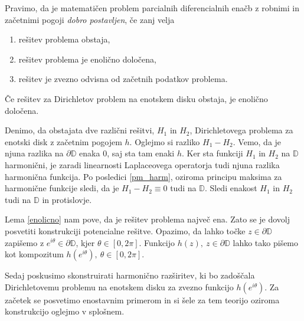 \documentclass[mat1, tisk]{fmfdelo}
\begin{document}
    \begin{definicija}[J. Hadamard]
        \label{def_dp}
        Pravimo, da je matematičen problem parcialnih diferencialnih enačb z robnimi in začetnimi pogoji \emph{dobro postavljen}, če zanj velja
        \begin{enumerate}[label={\Alph*)}]
            \item rešitev problema obstaja,
            \item rešitev problema je enolično določena,
            \item rešitev je zvezno odvisna od začetnih podatkov problema.
        \end{enumerate}
    \end{definicija}

    \begin{lema}
        \label{enolicno}
        Če rešitev za Dirichletov problem na enotskem disku obstaja, je enolično določena.
    \end{lema}
    \begin{dokaz}
        Denimo, da obstajata dve različni rešitvi, $H_1$ in $H_2$, Dirichletovega problema za enotski disk z začetnim pogojem $h$.
        Oglejmo si razliko $H_1 - H_2$. Vemo, da je njuna razlika na $\partial \mathbb{D}$ enaka $0$, saj sta tam enaki $h$. 
        Ker sta funkciji $H_1$ in $H_2$ na $\mathbb{D}$ harmonični, je zaradi linearnosti Laplaceovega operatorja tudi njuna razlika harmonična funkcija. 
        Po posledici \ref{pm_harm}, oziroma principu maksima za harmonične funkcije sledi, da je $H_1 - H_2 \equiv 0$ tudi na $\mathbb{D}$. Sledi enakost $H_1$ in $H_2$ tudi na $\mathbb{D}$ in protislovje. 
    \end{dokaz}
    
    Lema \ref{enolicno} nam pove, da je rešitev problema največ ena. Zato se je dovolj posvetiti konstrukciji potencialne rešitve. 
    Opazimo, da lahko točke $z \in \partial \mathbb{D}$ zapišemo z \mbox{$e^{i \theta} \in \partial \mathbb{D}$}, kjer $\theta \in [0,2\pi]$. Funkcijo $h(z),~z \in \partial \mathbb{D}$ lahko tako pišemo kot kompozitum $h(e^{i \theta}),~\theta \in [0,2\pi]$.

    Sedaj poskusimo skonstruirati harmonično razširitev, ki bo zadoščala Dirichletovemu problemu na enotskem disku za zvezno funkcijo $h(e^{i \theta})$.
    Za začetek se posvetimo enostavnim primerom in si šele za tem teorijo oziroma konstrukcijo oglejmo v splošnem. 
    
\end{document}
